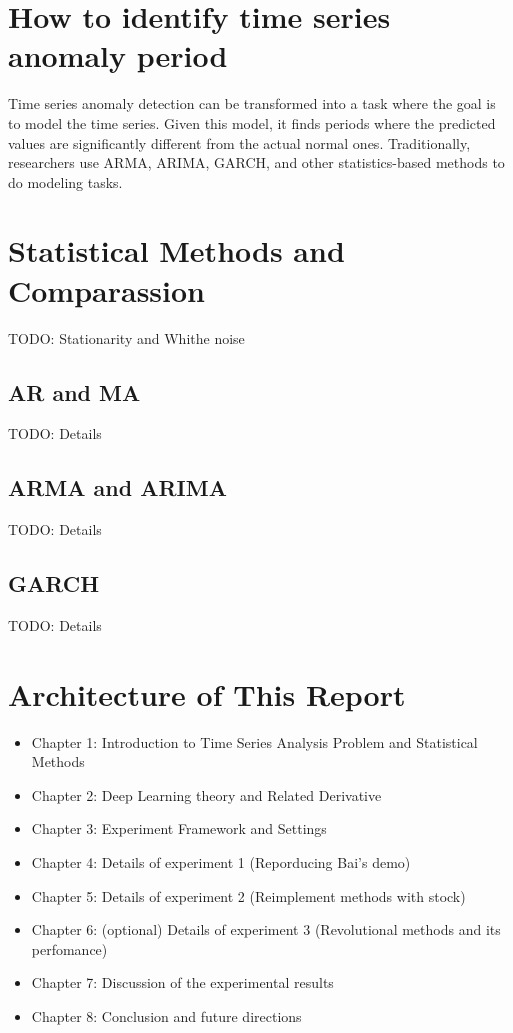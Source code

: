 \section{How to identify time series anomaly period}

Time series anomaly detection can be transformed into a task where the goal is to model the time series. Given this model, it finds periods where the predicted values are significantly different from the actual normal ones. Traditionally, researchers use ARMA, ARIMA, GARCH, and other statistics-based methods to do modeling tasks.

\section{Statistical Methods and Comparassion}
TODO: Stationarity and Whithe noise
\subsection{AR and MA}
TODO: Details
\subsection{ARMA and ARIMA}
TODO: Details
\subsection{GARCH}
TODO: Details


\section{Architecture of This Report}

\begin{itemize}
\item Chapter 1: Introduction to Time Series Analysis Problem and Statistical Methods
\item Chapter 2: Deep Learning theory and Related Derivative
\item Chapter 3: Experiment Framework and Settings
\item Chapter 4: Details of experiment 1 (Reporducing Bai's demo)
\item Chapter 5: Details of experiment 2 (Reimplement methods with stock)
\item Chapter 6: (optional) Details of experiment 3 (Revolutional methods and its perfomance)
\item Chapter 7: Discussion of the experimental results
\item Chapter 8: Conclusion and future directions
\end{itemize}
